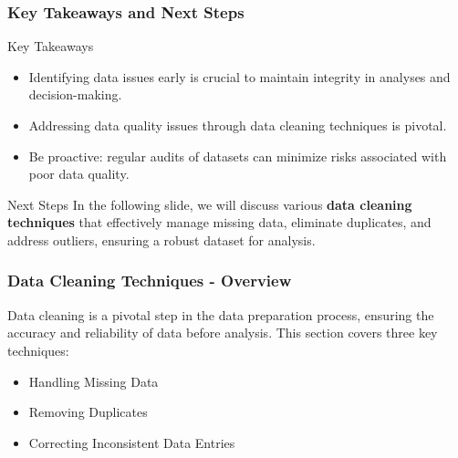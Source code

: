 \documentclass[aspectratio=169]{beamer}
\begin{document}
\begin{frame}[fragile]
    \frametitle{Key Takeaways and Next Steps}
    \begin{block}{Key Takeaways}
        \begin{itemize}
            \item Identifying data issues early is crucial to maintain integrity in analyses and decision-making.
            \item Addressing data quality issues through data cleaning techniques is pivotal.
            \item Be proactive: regular audits of datasets can minimize risks associated with poor data quality.
        \end{itemize}
    \end{block}

    \begin{block}{Next Steps}
        In the following slide, we will discuss various \textbf{data cleaning techniques} that effectively manage missing data, eliminate duplicates, and address outliers, ensuring a robust dataset for analysis.
    \end{block}
\end{frame}

\begin{frame}[fragile]
    \frametitle{Data Cleaning Techniques - Overview}
    Data cleaning is a pivotal step in the data preparation process, ensuring the accuracy and reliability of data before analysis. This section covers three key techniques: 
    \begin{itemize}
        \item Handling Missing Data
        \item Removing Duplicates
        \item Correcting Inconsistent Data Entries
    \end{itemize}
\end{frame}
\end{document}

